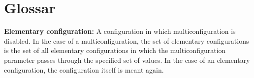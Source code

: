 \documentclass[parskip=full,11pt]{scrartcl}
\begin{document}
\section{Glossar}
\textbf{Elementary configuration:}
A configuration in which multiconfiguration is disabled. In the case of a multiconfiguration, the set of elementary configurations is the set of all elementary configurations in which the multiconfiguration parameter passes through the specified set of values. In the case of an elementary configuration, the configuration itself is meant again.
\end{document}
